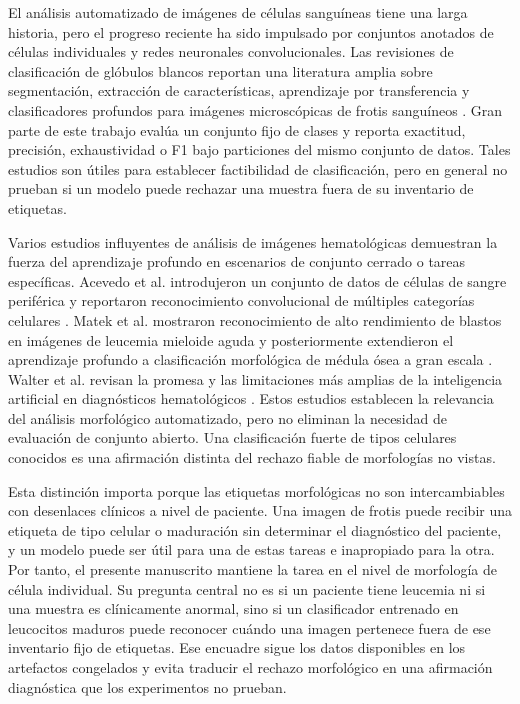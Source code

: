 \documentclass[11pt]{article}
\begin{document}
El análisis automatizado de imágenes de células sanguíneas tiene una larga historia, pero el progreso reciente ha sido impulsado por conjuntos anotados de células individuales y redes neuronales convolucionales. Las revisiones de clasificación de glóbulos blancos reportan una literatura amplia sobre segmentación, extracción de características, aprendizaje por transferencia y clasificadores profundos para imágenes microscópicas de frotis sanguíneos \cite{khan2021_wbc_review,deshpande2021_blood_cells_review}. Gran parte de este trabajo evalúa un conjunto fijo de clases y reporta exactitud, precisión, exhaustividad o F1 bajo particiones del mismo conjunto de datos. Tales estudios son útiles para establecer factibilidad de clasificación, pero en general no prueban si un modelo puede rechazar una muestra fuera de su inventario de etiquetas.

Varios estudios influyentes de análisis de imágenes hematológicas demuestran la fuerza del aprendizaje profundo en escenarios de conjunto cerrado o tareas específicas. Acevedo et al. introdujeron un conjunto de datos de células de sangre periférica y reportaron reconocimiento convolucional de múltiples categorías celulares \cite{acevedo2019_peripheral_blood_cnn}. Matek et al. mostraron reconocimiento de alto rendimiento de blastos en imágenes de leucemia mieloide aguda y posteriormente extendieron el aprendizaje profundo a clasificación morfológica de médula ósea a gran escala \cite{matek2019_blast,matek2021_bone_marrow}. Walter et al. revisan la promesa y las limitaciones más amplias de la inteligencia artificial en diagnósticos hematológicos \cite{walter2023_ai_hematology}. Estos estudios establecen la relevancia del análisis morfológico automatizado, pero no eliminan la necesidad de evaluación de conjunto abierto. Una clasificación fuerte de tipos celulares conocidos es una afirmación distinta del rechazo fiable de morfologías no vistas.

Esta distinción importa porque las etiquetas morfológicas no son intercambiables con desenlaces clínicos a nivel de paciente. Una imagen de frotis puede recibir una etiqueta de tipo celular o maduración sin determinar el diagnóstico del paciente, y un modelo puede ser útil para una de estas tareas e inapropiado para la otra. Por tanto, el presente manuscrito mantiene la tarea en el nivel de morfología de célula individual. Su pregunta central no es si un paciente tiene leucemia ni si una muestra es clínicamente anormal, sino si un clasificador entrenado en leucocitos maduros puede reconocer cuándo una imagen pertenece fuera de ese inventario fijo de etiquetas. Ese encuadre sigue los datos disponibles en los artefactos congelados y evita traducir el rechazo morfológico en una afirmación diagnóstica que los experimentos no prueban.
\end{document}
